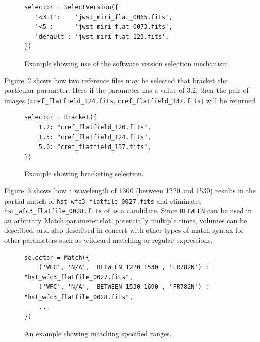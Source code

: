 \documentclass[final,authoryear,5p,times,twocolumn]{elsarticle}
\begin{document}
\begin{figure}
\begin{mdframed}
\begin{verbatim}
selector = SelectVersion({
   '<3.1':    'jwst_miri_flat_0065.fits',
   '<5':      'jwst_miri_flat_0073.fits',
   'default': 'jwst_miri_flat_123.fits',
})
\end{verbatim}
\end{mdframed}
\caption{Example showing use of the software version selection mechanism.}
\label{fig:example2}
\end{figure}

Figure~\ref{fig:example3} shows how two reference files may be selected
that bracket the particular parameter. Here if the parameter has a value 
of 3.2, then the pair of images 
(\texttt{cref\_flatfield\_124.fits}, \texttt{cref\_flatfield\_137.fits}) will be returned

\begin{figure}
\begin{mdframed}
\begin{verbatim}
selector = Bracket({
    1.2: "cref_flatfield_120.fits",
    1.5: "cref_flatfield_124.fits",
    5.0: "cref_flatfield_137.fits",
})
\end{verbatim}
\end{mdframed}
\caption{Example showing bracketing selection.}
\label{fig:example3}
\end{figure}

Figure~\ref{fig:example4} shows how a
wavelength of 1300 (between 1220 and 1530) results in the partial match 
of \texttt{hst\_wfc3\_flatfile\_0027.fits} and eliminates 
\texttt{hst\_wfc3\_flatfile\_0028.fits}
of as a candidate.   Since \texttt{BETWEEN}
can be used in an arbitrary Match parameter
slot,  potentially multiple times,  volumes can be described, and also
described in concert with other types of match syntax for other parameters
such as wildcard matching or regular expressions.

\begin{figure}
\begin{mdframed}
\begin{verbatim}
selector = Match({
    ('WFC', 'N/A', 'BETWEEN 1220 1530', 'FR782N') :  "hst_wfc3_flatfile_0027.fits",
    ('WFC', 'N/A', 'BETWEEN 1530 1690', 'FR782N') :  "hst_wfc3_flatfile_0028.fits",
    ...
})
\end{verbatim}
\end{mdframed}
\caption{An example showing matching specified ranges.}
\label{fig:example4}
\end{figure}
\end{document}
